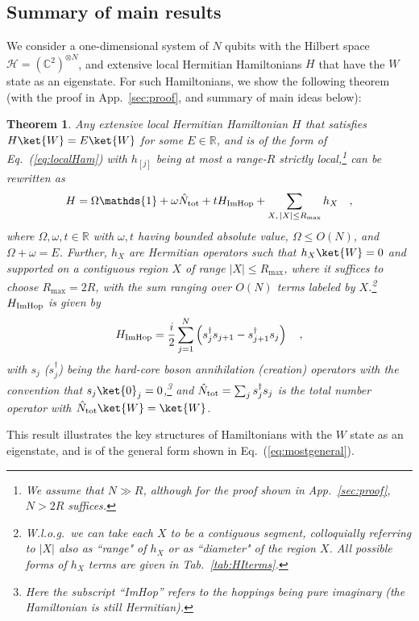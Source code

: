 \documentclass[prx,letterpaper,aps,superscriptaddress,floatfix,twocolumn,nofootinbib]{revtex4-2}
\newtheorem{thm}{Theorem}
\theoremstyle{definition}
\begin{document}
\subsection{Summary of main results}
%
We consider a one-dimensional system of $N$ qubits with the Hilbert space $\mathcal{H} = \left(\mathbb{C}^2\right)^{\otimes N}$, and extensive local Hermitian Hamiltonians $H$ that have the $W$ state as an eigenstate. 
%
For such Hamiltonians, we show the following theorem (with the proof in App.~\ref{sec:proof}, and summary of main ideas below):
%
\begin{thm}
\label{thm:HW}
Any extensive local Hermitian Hamiltonian $H$ that satisfies $H \ket{W} = E \ket{W}$ for some $E \in \mathbb{R}$, and is of the form of Eq.~(\ref{eq:localHam}) with $h_{[j]}$ being at most a range-$R$ strictly local,\footnote{We assume that $N \gg R$, although for the proof shown in App.~\ref{sec:proof}, $N > 2R$ suffices.} can be rewritten as
\begin{align}
    H =  \Omega \mathds{1} + \omega \hat{N}_{\rm tot} + t H_{\rm ImHop} + \sum_{X,\,|X|\leq R_{\text{max}}} h_X \quad,
    \label{eq:HW}
\end{align}
%
where $\Omega,\omega,t\in \mathbb{R}$ with $\omega,t$ having bounded absolute value, $\Omega\leq O(N)$, and $\Omega + \omega = E$.
%
Further, $h_X$ are Hermitian operators such that $h_X \ket{W} = 0$ and supported on a contiguous region $X$ of range $|X|\leq R_{\text{max}}$, where it suffices to choose $R_{\text{max}} = 2R$, with the sum ranging over $O(N)$ terms labeled by $X$.\footnote{W.l.o.g.\ we can take each $X$ to be a contiguous segment, colloquially referring to $|X|$ also as ``range" of $h_X$ or as ``diameter" of the region $X$.
All possible forms of $h_X$ terms are given in Tab.~\ref{tab:HIterms}.}
$H_{\rm ImHop}$ is given by
\begin{align}
    H_{\rm ImHop}=\frac{i}{2}\sum_{j=1}^N \left(s_j^\dag s_{j+1}-s_{j+1}^\dag s_j\right)\quad,
    \label{eq:HII}
\end{align}
with $s_j$ ($s_j^\dag$) being the hard-core boson annihilation (creation) operators with the convention that $s_j\ket{0}_j=0$,\footnote{Here the subscript ``ImHop'' refers to the hoppings being pure imaginary (the Hamiltonian is still Hermitian).} and $\hat{N}_{\rm tot}=\sum_j s_j^\dag s_j$ is the total number operator with $\hat{N}_{\rm tot}\ket{W}=\ket{W}$.
\end{thm}
%
%
This result illustrates the key structures of Hamiltonians with the $W$ state as an eigenstate, and is of the general form shown in Eq.~(\ref{eq:mostgeneral}).
\end{document}
